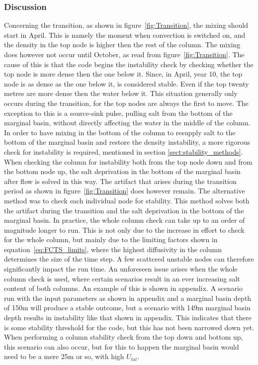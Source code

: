 \documentclass[twocolumn]{article}
\begin{document}
\subsubsection{Discussion}
Concerning the transition, as shown in figure~\ref{fig:Transition}, the mixing should start in April. This is namely the moment when convection is switched on, and the density in the top node is higher then the rest of the column. The mixing does however not occur until October, as read from figure~\ref{fig:Transition}. The cause of this is that the code begins the instability check by checking whether the top node is more dense then the one below it. Since, in April, year 10, the top node is as dense as the one below it, is considered stable. Even if the top twenty metres are more dense then the water below it. This situation generally only occurs during the transition, for the top nodes are always the first to move. The exception to this is a source-sink pulse, pulling salt from the bottom of the marginal basin, without directly affecting the water in the middle of the column. In order to have mixing in the bottom of the column to resupply salt to the bottom of the marginal basin and restore the density instability, a more rigorous check for instability is required, mentioned in section \ref{sect:stability_methods}. When checking the column for instability both from the top node down and from the bottom node up, the salt deprivation in the bottom of the marginal basin after flow is solved in this way. The artifact that arises during the transition period as shown in figure~\ref{fig:Transition} does however remain.
The alternative method was to check each individual node for stability. This method solves both the artifact during the transition and the salt deprivation in the bottom of the marginal basin. In practice, the whole column check can take up to an order of magnitude longer to run. This is not only due to the increase in effort to check for the whole column, but mainly due to the limiting factors shown in equation~\ref{eq:FCTS_limits}, where the highest diffusivity in the column determines the size of the time step. A few scattered unstable nodes can therefore significantly impact the run time. 
An unforeseen issue arises when the whole column check is used, where certain scenarios result in an ever increasing salt content of both columns. An example of this is shown in appendix. A scenario run with the input parameters as shown in appendix and a marginal basin depth of 150m will produce a stable outcome, but a scenario with 149m marginal basin depth results in instability like that shown in appendix. This indicates that there is some stability threshold for the code, but this has not been narrowed down yet. When performing a column stability check from the top down and bottom up, this scenario can also occur, but for this to happen the marginal basin would need to be a mere 25m or so, with high $U_{lat}$.
\end{document}

